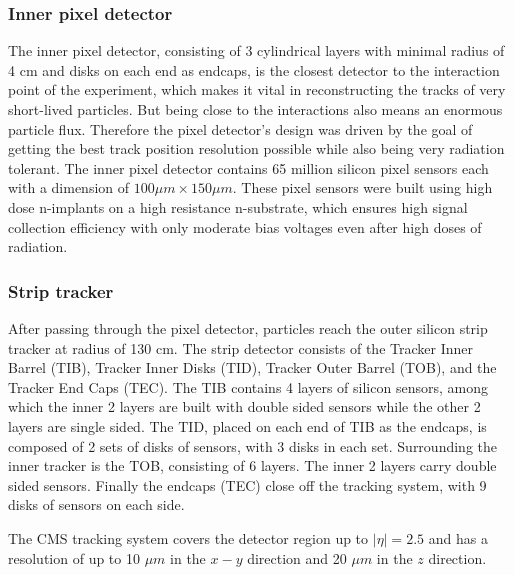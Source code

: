 \subsubsection{Inner pixel detector}
The inner pixel detector, consisting of 3 cylindrical layers with minimal radius of 4 cm and disks on each end as endcaps, is the closest detector to the interaction point of the experiment, which makes it vital in reconstructing the tracks of very short-lived particles. But being close to the interactions also means an enormous particle flux. Therefore the pixel detector's design was driven by the goal of getting the best track position resolution possible while also being very radiation tolerant. The inner pixel detector contains 65 million silicon pixel sensors each with a dimension of $100\mu m \times 150\mu m$. These pixel sensors were built using high dose n-implants on a high resistance n-substrate, which ensures high signal collection efficiency with only moderate bias voltages even after high doses of radiation.
\subsubsection{Strip tracker}
After passing through the pixel detector, particles reach the outer silicon strip tracker at radius of 130 cm. The strip detector consists of the Tracker Inner Barrel (TIB), Tracker Inner Disks (TID), Tracker Outer Barrel (TOB), and the Tracker End Caps (TEC). The TIB contains 4 layers of silicon sensors, among which the inner 2 layers are built with double sided sensors while the other 2 layers are single sided. The TID, placed on each end of TIB as the endcaps, is composed of 2 sets of disks of sensors, with 3 disks in each set. Surrounding the inner tracker is the TOB, consisting of 6 layers. The inner 2 layers carry double sided sensors. Finally the endcaps (TEC) close off the tracking system, with 9 disks of sensors on each side. 

\vspace{0.3cm}
The CMS tracking system covers the detector region up to $|\eta| = 2.5$ and has a resolution of up to 10 $\mu m$ in the $x-y$ direction and 20 $\mu m$ in the $z$ direction. 

